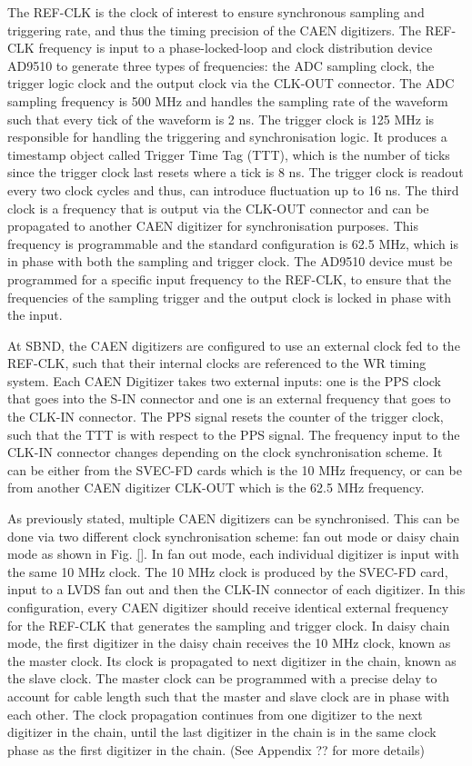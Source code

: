 The REF-CLK is the clock of interest to ensure synchronous sampling and triggering rate, and thus the timing precision of the CAEN digitizers.
The REF-CLK frequency is input to a phase-locked-loop and clock distribution device AD9510 to generate three types of frequencies: the ADC sampling clock, the trigger logic clock and the output clock via the CLK-OUT connector.
The ADC sampling frequency is 500 MHz and handles the sampling rate of the waveform such that every tick of the waveform is 2 ns. 
The trigger clock is 125 MHz is responsible for handling the triggering and synchronisation logic.
It produces a timestamp object called Trigger Time Tag (TTT), which is the number of ticks since the trigger clock last resets where a tick is 8 ns.
The trigger clock is readout every two clock cycles and thus, can introduce fluctuation up to 16 ns.
The third clock is a frequency that is output via the CLK-OUT connector and can be propagated to another CAEN digitizer for synchronisation purposes.
This frequency is programmable and the standard configuration is 62.5 MHz, which is in phase with both the sampling and trigger clock.
The AD9510 device must be programmed for a specific input frequency to the REF-CLK, to ensure that the frequencies of the sampling trigger and the output clock is locked in phase with the input.

At SBND, the CAEN digitizers are configured to use an external clock fed to the REF-CLK, such that their internal clocks are referenced to the WR timing system. 
Each CAEN Digitizer takes two external inputs: one is the PPS clock that goes into the S-IN connector and one is an external frequency that goes to the CLK-IN connector.
The PPS signal resets the counter of the trigger clock, such that the TTT is with respect to the PPS signal.
The frequency input to the CLK-IN connector changes depending on the clock synchronisation scheme. 
It can be either from the SVEC-FD cards which is the 10 MHz frequency, or can be from another CAEN digitizer CLK-OUT which is the 62.5 MHz frequency.

As previously stated, multiple CAEN digitizers can be synchronised. 
This can be done via two different clock synchronisation scheme: fan out mode or daisy chain mode as shown in Fig. \ref{}.
In fan out mode, each individual digitizer is input with the same 10 MHz clock.
The 10 MHz clock is produced by the SVEC-FD card, input to a LVDS fan out and then the CLK-IN connector of each digitizer.
In this configuration, every CAEN digitizer should receive identical external frequency for the REF-CLK that generates the sampling and trigger clock.
In daisy chain mode, the first digitizer in the daisy chain receives the 10 MHz clock, known as the master clock.
Its clock is propagated to next digitizer in the chain, known as the slave clock.
The master clock can be programmed with a precise delay to account for cable length such that the master and slave clock are in phase with each other.
The clock propagation continues from one digitizer to the next digitizer in the chain, until the last digitizer in the chain is in the same clock phase as the first digitizer in the chain. (See Appendix ?? for more details) 

